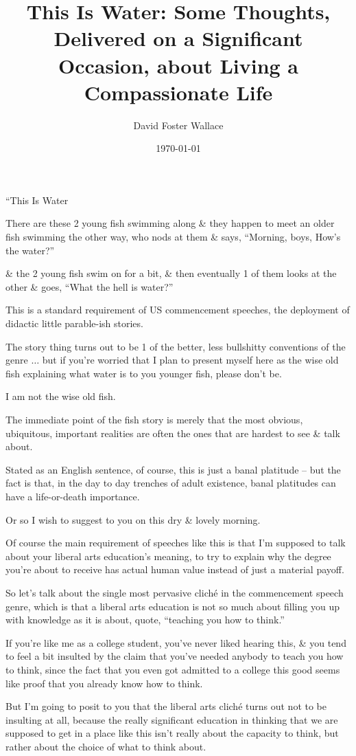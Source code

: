 \documentclass{article}
\title{This Is Water: Some Thoughts, Delivered on a Significant Occasion, about Living a Compassionate Life}
\author{David Foster Wallace}
\date{\today}
\numberwithin{equation}{section}
\begin{document}
\maketitle

``This Is Water

There are these 2 young fish swimming along \& they happen to meet an older fish swimming the other way, who nods at them \& says, ``Morning, boys, How's the water?''

\& the 2 young fish swim on for a bit, \& then eventually 1 of them looks at the other \& goes, ``What the hell is water?''

This is a standard requirement of US commencement speeches, the deployment of didactic little parable-ish stories.

The story thing turns out to be 1 of the better, less bullshitty conventions of the genre $\ldots$ but if you're worried that I plan to present myself here as the wise old fish explaining what water is to you younger fish, please don't be.

I am not the wise old fish.

The immediate point of the fish story is merely that the most obvious, ubiquitous, important realities are often the ones that are hardest to see \& talk about.

Stated as an English sentence, of course, this is just a banal platitude -- but the fact is that, in the day to day trenches of adult existence, banal platitudes can have a life-or-death importance.

Or so I wish to suggest to you on this dry \& lovely morning.

Of course the main requirement of speeches like this is that I'm supposed to talk about your liberal arts education's meaning, to try to explain why the degree you're about to receive has actual human value instead of just a material payoff.

So let's talk about the single most pervasive clich\'e in the commencement speech genre, which is that a liberal arts education is not so much about filling you up with knowledge as it is about, quote, ``teaching you how to think.''

If you're like me as a college student, you've never liked hearing this, \& you tend to feel a bit insulted by the claim that you've needed anybody to teach you how to think, since the fact that you even got admitted to a college this good seems like proof that you already know how to think.

But I'm going to posit to you that the liberal arts clich\'e turns out not to be insulting at all, because the really significant education in thinking that we are supposed to get in a place like this isn't really about the capacity to think, but rather about the choice of what to think about.
\end{document}
